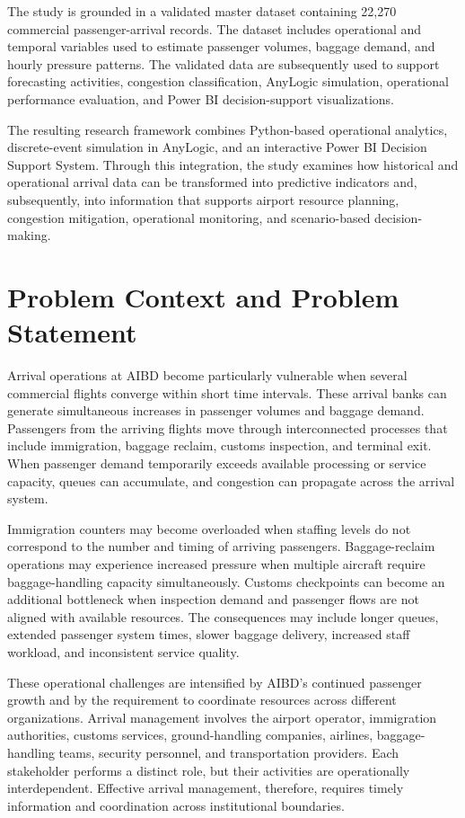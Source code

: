 The study is grounded in a validated master dataset containing 22,270 commercial passenger-arrival records. The dataset includes operational and temporal variables used to estimate passenger volumes, baggage demand, and hourly pressure patterns. The validated data are subsequently used to support forecasting activities, congestion classification, AnyLogic simulation, operational performance evaluation, and Power BI decision-support visualizations.

The resulting research framework combines Python-based operational analytics, discrete-event simulation in AnyLogic, and an interactive Power BI Decision Support System. Through this integration, the study examines how historical and operational arrival data can be transformed into predictive indicators and, subsequently, into information that supports airport resource planning, congestion mitigation, operational monitoring, and scenario-based decision-making.

\section{Problem Context and Problem Statement}
\label{sec:problem-context-statement}

Arrival operations at AIBD become particularly vulnerable when several commercial flights converge within short time intervals. These arrival banks can generate simultaneous increases in passenger volumes and baggage demand. Passengers from the arriving flights move through interconnected processes that include immigration, baggage reclaim, customs inspection, and terminal exit. When passenger demand temporarily exceeds available processing or service capacity, queues can accumulate, and congestion can propagate across the arrival system.

Immigration counters may become overloaded when staffing levels do not correspond to the number and timing of arriving passengers. Baggage-reclaim operations may experience increased pressure when multiple aircraft require baggage-handling capacity simultaneously. Customs checkpoints can become an additional bottleneck when inspection demand and passenger flows are not aligned with available resources. The consequences may include longer queues, extended passenger system times, slower baggage delivery, increased staff workload, and inconsistent service quality.

These operational challenges are intensified by AIBD's continued passenger growth and by the requirement to coordinate resources across different organizations. Arrival management involves the airport operator, immigration authorities, customs services, ground-handling companies, airlines, baggage-handling teams, security personnel, and transportation providers. Each stakeholder performs a distinct role, but their activities are operationally interdependent. Effective arrival management, therefore, requires timely information and coordination across institutional boundaries.

